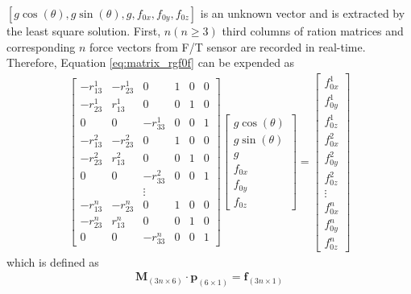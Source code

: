 $[g\cos(\theta),g\sin(\theta),g,f_{0x},f_{0y},f_{0z}]$ is an unknown vector and is extracted by the least square solution. First, $n(n\geq3)$ third columns of ration matrices and corresponding $n$ force vectors from F/T sensor are recorded in real-time. Therefore, Equation \ref{eq:matrix_rgf0f} can be expended as
\begin{equation}
\label{eq:rgf}
\begin{split}
\begin{bmatrix}
-r_{13}^1		&-r_{23} ^1		&0			&1		&0		&0\\
-r_{23}^1		&r_{13}^1		&0			&0		&1		&0\\
0				&0				&-r_{33}^1	&0		&0		&1\\
-r_{13}^2		&-r_{23}^2 		&0			&1		&0		&0\\
-r_{23}^2		&r_{13}^2		&0			&0		&1		&0\\
0				&0				&-r_{33}^2	&0		&0		&1\\
&&\vdots\\
-r_{13}^n		&-r_{23}^n 		&0			&1		&0		&0\\
-r_{23}^n		&r_{13}^n		&0			&0		&1		&0\\
0				&0				&-r_{33}^n	&0		&0		&1
\end{bmatrix}
\begin{bmatrix}
g\cos(\theta)\\
g\sin(\theta)\\
g\\
f_{0x}\\
f_{0y}\\
f_{0z}
\end{bmatrix}
=
\begin{bmatrix}
f^1_{0x}\\
f^1_{0y}\\
f^1_{0z}\\
f^2_{0x}\\
f^2_{0y}\\
f^2_{0z}\\
\vdots\\
f^n_{0x}\\
f^n_{0y}\\
f^n_{0z}
\end{bmatrix}
\end{split}
\end{equation}
which is defined as 
\begin{equation*}
\begin{split}
\mathbf{M}_{\left(3n \times 6\right)} \cdot \boldsymbol{p}_{\left(6 \times 1\right)} = \boldsymbol{f}_{\left(3n \times 1\right)}
\end{split}
\end{equation*}

